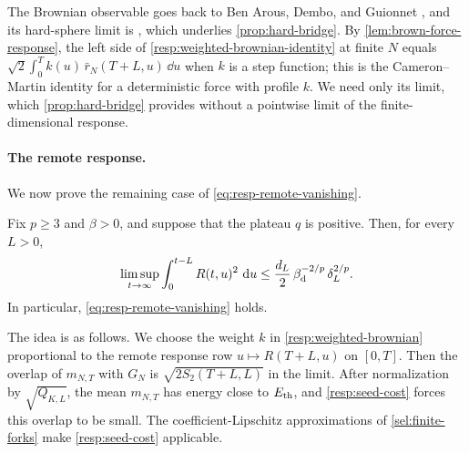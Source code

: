 The Brownian observable goes back to Ben Arous, Dembo, and Guionnet \cite[arXiv version~1, equation~(1.9), p.~4, and Theorem~1.2, p.~5]{bag2006}, and its hard-sphere limit is \cite[arXiv version~5, Definition~3, p.~22, and Theorem~4.3, p.~23]{sellke2024}, which underlies \cref{prop:hard-bridge}. By \cref{lem:brown-force-response}, the left side of \eqref{resp:weighted-brownian-identity} at finite $N$ equals $\sqrt2\int_0^Tk(u)\,\bar r_N(T+L,u)\,\dd u$ when $k$ is a step function; this is the Cameron--Martin identity for a deterministic force with profile $k$. We need only its limit, which \cref{prop:hard-bridge} provides without a pointwise limit of the finite-dimensional response.

\paragraph{The remote response.}
We now prove the remaining case of \eqref{eq:resp-remote-vanishing}.

\begin{proposition}\label{prop:remote-response-general}
Fix $p\ge3$ and $\beta>0$, and suppose that the plateau $q$ is positive. Then, for every $L>0$,
\begin{equation}\label{eq:resp-general-remote-bound}
 \limsup_{t\to\infty}\int_0^{t-L}R(t,u)^2\,\mathop{}\!\mathrm d u\le\frac{d_L}2\,\beta_{\mathrm d}^{-2/p}\,\delta_L^{2/p}.
\end{equation}
In particular, \eqref{eq:resp-remote-vanishing} holds.
\end{proposition}

The idea is as follows. We choose the weight $k$ in \cref{resp:weighted-brownian} proportional to the remote response row $u\mapsto R(T+L,u)$ on $[0,T]$. Then the overlap of $m_{N,T}$ with $G_N$ is $\sqrt{2S_2(T+L,L)}$ in the limit. After normalization by $\sqrt{Q_{K,L}}$, the mean $m_{N,T}$ has energy close to $E_{\mathrm{th}}$, and \cref{resp:seed-cost} forces this overlap to be small. The coefficient-Lipschitz approximations of \cref{sel:finite-forks} make \cref{resp:seed-cost} applicable.

